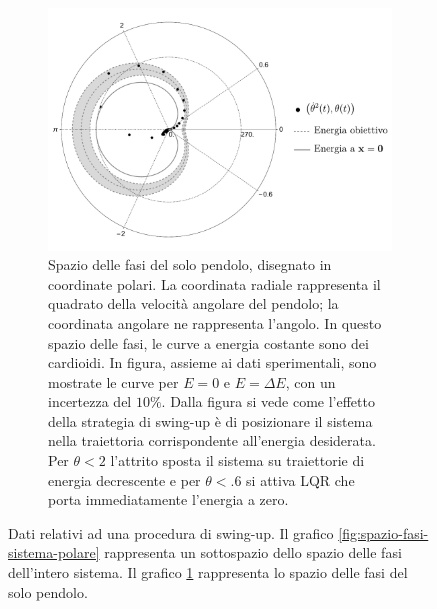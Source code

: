 \begin{figure}
    \begin{subfigure}[]{\textwidth}
        \centering
        \includegraphics[width=.65\textwidth]{assets/polar-swingup-energy}
        \caption{
            Spazio delle fasi del solo pendolo, disegnato in coordinate polari.
            La coordinata radiale rappresenta il quadrato della velocità angolare
            del pendolo; la coordinata angolare ne rappresenta l'angolo.
            In questo spazio delle fasi, le curve a energia costante sono dei
            cardioidi. In figura, assieme ai dati sperimentali, sono
            mostrate le curve per $E=0$ e $E=\Delta E$, con un incertezza del
            $10\%$. Dalla figura si vede come l'effetto della strategia di swing-up
            è di posizionare il sistema nella traiettoria corrispondente
            all'energia desiderata.
            Per $\theta < 2$ l'attrito sposta il sistema su traiettorie di
            energia decrescente e per $\theta < .6$ si attiva LQR che porta
            immediatamente l'energia a zero.
        }
        \label{fig:spazio-fasi-pendolo-polare}
    \end{subfigure}

    \caption[Dati di una procedura di swing-up]{
        Dati relativi ad una procedura di swing-up. Il grafico
        \ref{fig:spazio-fasi-sistema-polare} rappresenta un sottospazio dello
        spazio delle fasi dell'intero sistema. Il grafico
        \ref{fig:spazio-fasi-pendolo-polare} rappresenta lo spazio delle fasi del
        solo pendolo.
    }
    \label{fig:swingup-real-one}
\end{figure}

